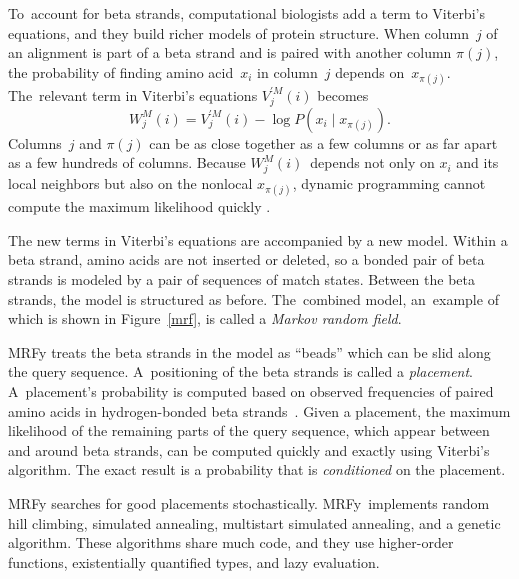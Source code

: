 \documentclass[nonatbib,preprint,blockstyle,times]{sigplanconf}
\newcommand\mrfy{MRFy} %
\newcommand\pairedwith[1]{{\pi(#1)}}
\newcommand\figref[1]{Figure~\ref{#1}}
\let\cite\citep
\begin{document}
To~account for beta strands, computational biologists add
a term to Viterbi's equations, and they build
richer models of protein structure.
When column~$j$ of an alignment is part of a beta strand and is paired
with another column  $\pairedwith j$,
the probability of finding amino acid~$x_i$ in column~$j$ 
depends on~$x_{\pairedwith j}$.
The~relevant term in
Viterbi's equations 
$V_{j}^{\prime M}(i)$ becomes
$$W_{j}^{M}(i) = V_{j}^{\prime M}(i) - \log P(x_{i} \mid x_{\pairedwith j}).$$
Columns~$j$ and $\pairedwith j$ can be as close together as a few
columns or as far apart as a few hundreds of columns.
Because $W_j^M(i)$~depends not only on $x_i$ and its local neighbors but
also on the nonlocal $x_{\pairedwith j}$, 
dynamic programming cannot compute the maximum likelihood quickly
\cite{Menke:2010ti,Daniels:2012}.

The new terms in Viterbi's equations are accompanied by a new model.
Within a beta strand, amino acids are not inserted or deleted, so
a bonded pair of beta strands is modeled by
 a pair of sequences of match states.
Between the beta strands, the model is structured as before.
The~combined model, an~example of which is shown in \figref{mrf}, is called a
\textit{Markov random field}. 


MRFy treats the beta 
strands in the model
 as ``beads'' which can be slid along the query sequence.
A~positioning of the beta strands is called
 a \emph{placement}.
A~placement's probability is computed
based on observed frequencies of paired amino acids in 
hydrogen-bonded beta strands~\cite{Cowen:2002p588}.
Given a placement, the maximum likelihood of the remaining parts of
the query sequence, which appear between and around beta strands,
can be computed quickly and exactly 
using Viterbi's algorithm.
The exact result is a probability that is
\emph{conditioned} on the placement.

MRFy searches for good placements stochastically.
\mrfy\ implements
random hill
climbing, simulated  
annealing, multistart simulated annealing, and a genetic algorithm.
These algorithms share much code, and they use higher-order functions,
existentially 
quantified types, and lazy evaluation.
\end{document}
